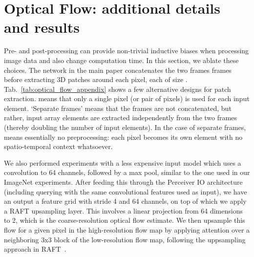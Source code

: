 \documentclass{article} \usepackage{iclr2022_conference,times}
\newcommand{\ourmodel}{Perceiver IO\xspace}
\begin{document}
\section{Optical Flow: additional details and results}
\label{sec:flow_appendix}

Pre- and post-processing can provide non-trivial inductive biases when processing image data and also change computation time.  In this section, we ablate these choices.  The network in the main paper concatenates the two frames frames before extracting 3D patches around each pixel, each of size .  Tab.~\ref{tab:optical_flow_appendix} shows a few alternative designs for patch extraction.   means that only a single pixel (or pair of pixels) is used for each input element.  `Separate frames' means that the frames are not concatenated, but rather, input array elements are extracted independently from the two frames (thereby doubling the number of input elements).  In the case of separate frames,  means essentially no preprocessing: each pixel becomes its own element with no spatio-temporal context whatsoever.

We also performed experiments with a less expensive input model which uses a  convolution to 64 channels, followed by a max pool, similar to the one used in our ImageNet experiments.  After feeding this through the \ourmodel{} architecture (including querying with the same convolutional features used as input), we have an output a feature grid with stride 4 and 64 channels, on top of which we apply a RAFT upsampling layer.  This involves a linear projection from 64 dimensions to 2, which is the coarse-resolution optical flow estimate.  We then upsample this flow for a given pixel in the high-resolution flow map by applying attention over a neighboring 3x3 block of the low-resolution flow map, following the uppsampling approach in RAFT~\citep{teed2020raft}. 
\end{document}
